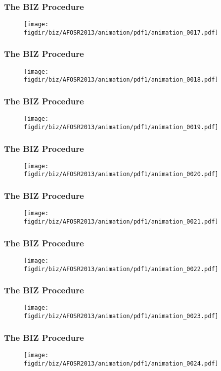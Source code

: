 \documentclass[13pt]{beamer}
\newcommand{\figdir}{../../fig}
\begin{document}
\begin{frame}\frametitle{The BIZ Procedure}\begin{figure}\texttt{[image: \\figdir/biz/AFOSR2013/animation/pdf1/animation\_0017.pdf]}\end{figure}\end{frame}
\begin{frame}\frametitle{The BIZ Procedure}\begin{figure}\texttt{[image: \\figdir/biz/AFOSR2013/animation/pdf1/animation\_0018.pdf]}\end{figure}\end{frame}
\begin{frame}\frametitle{The BIZ Procedure}\begin{figure}\texttt{[image: \\figdir/biz/AFOSR2013/animation/pdf1/animation\_0019.pdf]}\end{figure}\end{frame}
\begin{frame}\frametitle{The BIZ Procedure}\begin{figure}\texttt{[image: \\figdir/biz/AFOSR2013/animation/pdf1/animation\_0020.pdf]}\end{figure}\end{frame}
\begin{frame}\frametitle{The BIZ Procedure}\begin{figure}\texttt{[image: \\figdir/biz/AFOSR2013/animation/pdf1/animation\_0021.pdf]}\end{figure}\end{frame}
\begin{frame}\frametitle{The BIZ Procedure}\begin{figure}\texttt{[image: \\figdir/biz/AFOSR2013/animation/pdf1/animation\_0022.pdf]}\end{figure}\end{frame}
\begin{frame}\frametitle{The BIZ Procedure}\begin{figure}\texttt{[image: \\figdir/biz/AFOSR2013/animation/pdf1/animation\_0023.pdf]}\end{figure}\end{frame}
\begin{frame}\frametitle{The BIZ Procedure}\begin{figure}\texttt{[image: \\figdir/biz/AFOSR2013/animation/pdf1/animation\_0024.pdf]}\end{figure}\end{frame}
\end{document}
